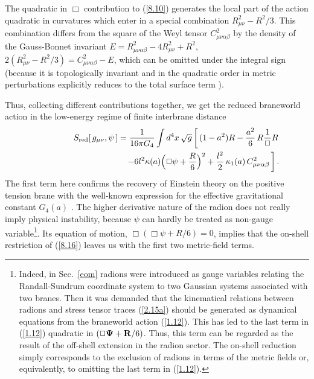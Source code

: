 \documentclass[a4paper,preprint,nofootinbib,
                 showpacs,preprintnumbers,amsmath,amssymb]{revtex4}
\begin{document}
The quadratic in $\Box$ contribution to (\ref{8.10}) generates the  
local part of the action quadratic in curvatures which enter in  
a special combination $R^2_{\mu\nu}-R^2/3$. This combination 
differs from the square of the Weyl tensor $C_{\mu\nu\alpha\beta}^2$ 
by the density of the Gauss-Bonnet invariant  
$E=R_{\mu\nu\alpha\beta}^2-4R^2_{\mu\nu}+R^2$, 
    $2(R^2_{\mu\nu}-R^2/3) 
    =C_{\mu\nu\alpha\beta}^2-E$, 
which can be omitted under the integral sign (because it is  
topologically invariant and in the quadratic order in metric 
perturbations explicitly reduces to the total surface term  
\cite{CPT,CPTIII}). 
 
Thus, collecting different contributions together, we get 
the reduced braneworld action in the low-energy regime of finite 
interbrane distance 
    \begin{eqnarray} 
    &&S_{\rm red}[\,g_{\mu\nu},\psi\,]=\frac1{16\pi G_4} 
    \int d^4x\,\sqrt{g} 
    \left[\,(1-a^2)R 
      -\frac{a^2}6\,R\frac1\Box R\right.\nonumber\\ 
    &&\qquad\qquad\qquad\qquad\qquad 
     \left. -6l^2\kappa(a) 
    \Big(\Box\psi+\frac R6\Big)^2 
    +\frac{l^2}2\,\kappa_1(a)\, 
    C_{\mu\nu\alpha\beta}^2\,\right].  \label{8.16} 
    \end{eqnarray} 
The first term here confirms the recovery of Einstein theory on 
the positive tension brane with the well-known expression for the 
effective gravitational constant $G_4(a)$ \cite{GT,ChGR}. The  
higher derivative nature of the 
radion does not really imply physical instability, because $\psi$  
can hardly be treated as non-gauge variable\footnote{Indeed, in  
Sec.~\ref{eom} radions were introduced as gauge variables relating the 
Randall-Sundrum coordinate system to two Gaussian systems associated 
with two branes. Then it was demanded that the kinematical relations 
between radions and stress tensor traces (\ref{2.15a}) should be  
generated as dynamical equations from the braneworld action (\ref{1.12}).  
This has led to the last term in (\ref{1.12}) quadratic in  
$(\Box{\bf\Psi}+{\bf R}/6)$. Thus, this term can be regarded as the  
result of the off-shell extension in the radion sector. The on-shell  
reduction simply corresponds to the exclusion of radions in terms of  
the metric fields or, equivalently, to omitting the last term in  
(\ref{1.12}).}. Its equation of motion, 
    $\Box\left(\Box\psi+R/6\right)=0$, 
implies that the on-shell restriction of (\ref{8.16}) leaves us with 
the first two metric-field terms.  
 
\end{document}
